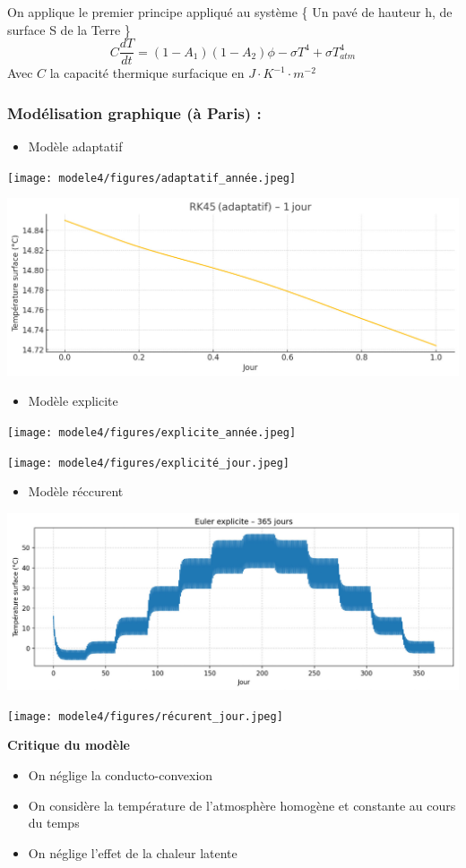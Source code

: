 \documentclass[a4paper,12pt]{article}
\begin{document}
On applique le premier principe appliqué au système \{ Un pavé de hauteur h, de surface S de la Terre \}
\ \ 
\[
C \frac{dT}{dt} =(1-A_1)(1-A_2)\phi-\sigma T^4+\sigma T_{atm}^4
\]
Avec \(C\) la capacité thermique surfacique en \(J\cdot K^{-1}\cdot m^{-2}\)
\subsubsection*{Modélisation graphique (à Paris) :} 
\begin{itemize}
    \item Modèle adaptatif
\end{itemize}

\begin{center}
  \texttt{[image: modele4/figures/adaptatif\_année.jpeg]}
  \end{center}
\begin{center}
  \includegraphics[width=0.8\linewidth]{modele4/figures/adaptatif_jour.jpeg}
  \end{center}
\begin{itemize}
    \item Modèle explicite
\end{itemize}


\begin{center}
  \texttt{[image: modele4/figures/explicite\_année.jpeg]}
  \end{center}
\begin{center}
  \texttt{[image: modele4/figures/explicité\_jour.jpeg]}
  \end{center}
\begin{itemize}
    \item Modèle réccurent
\end{itemize}

\begin{center}
  \includegraphics[width=0.8\linewidth]{modele4/figures/récurrent_année.jpeg}
  \end{center}
\begin{center}
  \texttt{[image: modele4/figures/récurent\_jour.jpeg]}
  \end{center}
\vspace{1cm}


\textbf{Critique du modèle}
\vspace{1cm}
\begin{itemize}
    \item On néglige la conducto-convexion
    \item On considère la température de l'atmosphère homogène et constante au cours du temps
    \item On néglige l'effet de la chaleur latente
\end{itemize}
\end{document}
